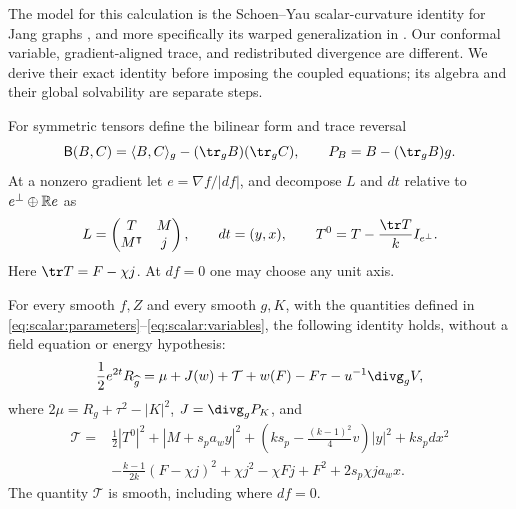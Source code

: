 The model for this calculation is the Schoen--Yau scalar-curvature
identity for Jang graphs \cite{SchoenYau1981}, and more specifically
its warped generalization in \cite[Identity~9, p.~580]{BrayKhuri2011}.
Our conformal variable, gradient-aligned trace, and redistributed
divergence are different. We derive their exact identity before
imposing the coupled equations; its algebra and their global
solvability are separate steps.

For symmetric tensors define the bilinear form and trace reversal
\[
 \mathsf B(B,C)=\langle B,C\rangle_g-(\tr_gB)(\tr_gC),
 \qquad P_B=B-(\tr_gB)g.
\]
At a nonzero gradient let $e=\nabla f/|df|$, and decompose $L$ and $dt$
relative to $e^\perp\oplus\mathbb R e$ as
\[
 L=\begin{pmatrix}T&M\\M^\intercal&j\end{pmatrix},\qquad dt=(y,x),
 \qquad T^0=T-\frac{\tr T}{k}I_{e^\perp}.
\]
Here $\tr T=F-\chi j$.  At $df=0$ one may choose any unit axis.

\begin{proposition}\label{prop:scalar:identity}
For every smooth $f,Z$ and every smooth $g,K$, with the quantities
defined in \eqref{eq:scalar:parameters}--\eqref{eq:scalar:variables},
the following identity holds, without a field equation or energy
hypothesis:
\begin{equation}
 \frac12e^{2t}R_{\widehat g}
 =\mu+J(w)+\mathcal T+w(F)-F\tau-u^{-1}\divg_g V,
 \label{eq:scalar:identity}
\end{equation}
where $2\mu=R_g+\tau^2-|K|^2$, $J=\divg_gP_K$, and
\begin{equation}
 \begin{aligned}
 \mathcal T={}&\frac12|T^0|^2+|M+s_pa_wy|^2
       +\left(ks_p-\frac{(k-1)^2}{4}v\right)|y|^2+ks_pd x^2\\
 &-\frac{k-1}{2k}(F-\chi j)^2+\chi j^2-\chi Fj+F^2
       +2s_p\chi j a_w x .
 \end{aligned}
 \label{eq:scalar:quadratic}
\end{equation}
The quantity $\mathcal T$ is smooth, including where $df=0$.
\end{proposition}

